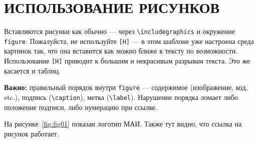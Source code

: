 \section{ИСПОЛЬЗОВАНИЕ РИСУНКОВ}

Вставляются рисунки как обычно --- через 
\texttt{\textbackslash includegraphics} и окружение 
\texttt{figure}. 
Пожалуйста, не используйте \texttt{[H]} --- 
в этом шаблоне уже настроена среда картинок так, 
что она вставится как можно ближе к тексту по возможности. 
Использование \texttt{[H]} приводит к большим и некрасивым 
разрывам текста. Это же касается и таблиц.

\textbf{Важно:} правильный порядок внутри \texttt{figure} --- содержимое (изображение, код, etc.), подпись (\texttt{\textbackslash caption}), метка (\texttt{\textbackslash label}). Нарушение порядка ломает либо положение подписи, либо нумерацию при ссылке.

На рисунке~\ref{fig:fig01} показан логотип МАИ. 
Также тут видно, что ссылка на рисунок работает.

